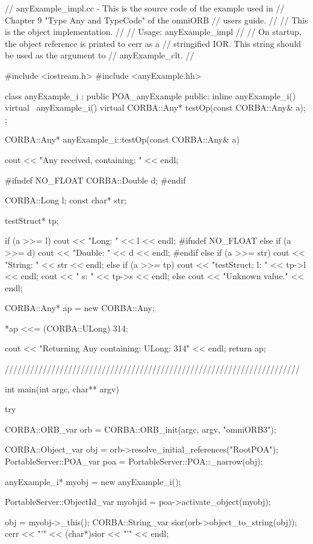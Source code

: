 \documentclass[11pt,twoside,a4paper]{book}
\begin{document}
\begin{cxxlisting}
// anyExample_impl.cc - This is the source code of the example used in
//                      Chapter 9 "Type Any and TypeCode" of the omniORB
//                      users guide.
//
//                      This is the object implementation.
//
// Usage: anyExample_impl
//
//        On startup, the object reference is printed to cerr as a
//        stringified IOR. This string should be used as the argument to 
//        anyExample_clt.
//

#include <iostream.h>
#include <anyExample.hh>

class anyExample_i : public POA_anyExample {
public:
  inline anyExample_i() {}
  virtual ~anyExample_i() {}
  virtual CORBA::Any* testOp(const CORBA::Any& a);
};

CORBA::Any* anyExample_i::testOp(const CORBA::Any& a)
{
  cout << "Any received, containing: " << endl;

#ifndef NO_FLOAT
  CORBA::Double d;
#endif

  CORBA::Long l;
  const char* str;

  testStruct* tp;

  if (a >>= l) {
    cout << "Long: " << l << endl;
  }
#ifndef NO_FLOAT
  else if (a >>= d) {
    cout << "Double: " << d << endl;
  }
#endif
  else if (a >>= str) {
    cout << "String: " << str << endl;
  }
  else if (a >>= tp) {
    cout << "testStruct: l: " << tp->l << endl;
    cout << "            s: " << tp->s << endl;
  }
  else {
    cout << "Unknown value." << endl;
  }

  CORBA::Any* ap = new CORBA::Any;

  *ap <<= (CORBA::ULong) 314;

  cout << "Returning Any containing: ULong: 314\n" << endl;
  return ap;
}

//////////////////////////////////////////////////////////////////////

int main(int argc, char** argv)
{
  try {
    CORBA::ORB_var orb = CORBA::ORB_init(argc, argv, "omniORB3");

    CORBA::Object_var obj = orb->resolve_initial_references("RootPOA");
    PortableServer::POA_var poa = PortableServer::POA::_narrow(obj);

    anyExample_i* myobj = new anyExample_i();

    PortableServer::ObjectId_var myobjid = poa->activate_object(myobj);

    obj = myobj->_this();
    CORBA::String_var sior(orb->object_to_string(obj));
    cerr << "'" << (char*)sior << "'" << endl;

}}
\end{cxxlisting}
\end{document}
